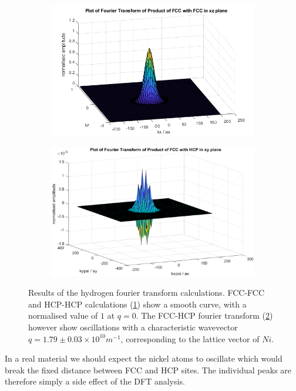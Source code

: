 \begin{figure}[htbp]
    \captionsetup[subfigure]{justification=centering}
    \centering
    \begin{subfigure}{0.45\linewidth}
        \centering
        \includegraphics[width= 0.9\linewidth]{Figures/Model/Plot of fourier transform of the wavefunction fccfcc xz plane.png}
        \label{fig:diagonal hydrogen matrix element no oscillation}
    \end{subfigure}
    \hfill
    \begin{subfigure}{0.45\linewidth}
        \centering
        \includegraphics[width= 0.9\linewidth]{Figures/Model/Plot of fourier transform of the wavefunction.png}
        \label{fig:cross hydrogen matrix element oscillation}
    \end{subfigure}
    \caption{Results of the hydrogen fourier transform calculations.
    FCC-FCC and HCP-HCP calculations
    (\cref{fig:diagonal hydrogen matrix element no oscillation})
    show a smooth curve, with a normalised
    value of \(1\) at \(q=0\).
    The FCC-HCP fourier transform
    (\cref{fig:cross hydrogen matrix element oscillation})
    however show oscillations with a characteristic
    wavevector \(q = 1.79 \pm 0.03 \times{}10^{10}m^{-1}\),
    corresponding to the lattice vector of \(Ni\).
    }\label{fig:fourier transform oscillation}
\end{figure}
In a real material
we should expect the nickel atoms
to oscillate which would break
the fixed distance between FCC and HCP
sites. The individual peaks
are therefore simply a side effect
of the DFT analysis.

